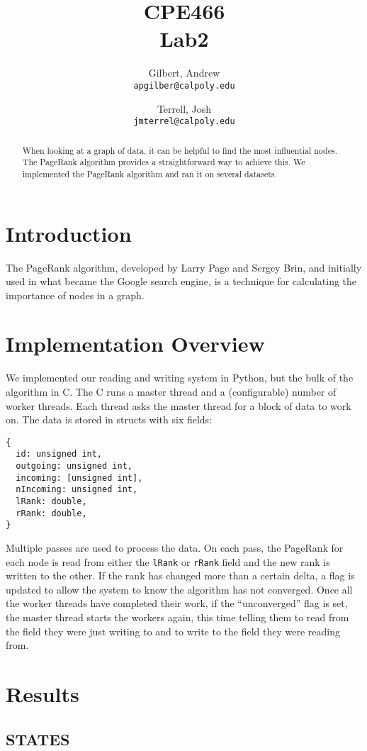 \documentclass{report}
\title{CPE466\\Lab2}
\author{
  Gilbert, Andrew\\
  \texttt{apgilber@calpoly.edu}
  \and
  Terrell, Josh\\
  \texttt{jmterrel@calpoly.edu}
}
\date{}
\begin{document}
\maketitle

\begin{abstract}
  When looking at a graph of data, it can be helpful to find the most
influential nodes. The PageRank algorithm provides a straightforward
way to achieve this. We implemented the PageRank algorithm and ran it
on several datasets.
\end{abstract}

\section{Introduction}
The PageRank algorithm, developed by Larry Page and Sergey Brin, and initially used in what became the Google search engine, is a technique for calculating the importance of nodes in a graph.



\section{Implementation Overview}
We implemented our reading and writing system in Python, but the bulk of the algorithm in C. The C runs a master thread and a (configurable) number of worker threads. Each thread asks the master thread for a block of data to work on. The data is stored in structs with six fields:
\begin{lstlisting}[lang=ANSI]
{
  id: unsigned int,
  outgoing: unsigned int,
  incoming: [unsigned int],
  nIncoming: unsigned int,
  lRank: double,
  rRank: double,
}
\end{lstlisting}
Multiple passes are used to process the data. On each pass, the
PageRank for each node is read from either the \texttt{lRank} or
\texttt{rRank} field and the new rank is written to the other. If the
rank has changed more than a certain delta, a flag is updated to allow
the system to know the algorithm has not converged. Once all the
worker threads have completed their work, if the ``unconverged'' flag
is set, the master thread starts the workers again, this time telling
them to read from the field they were just writing to and to write to
the field they were reading from.
\section{Results}
\subsection{STATES}
\end{document}
